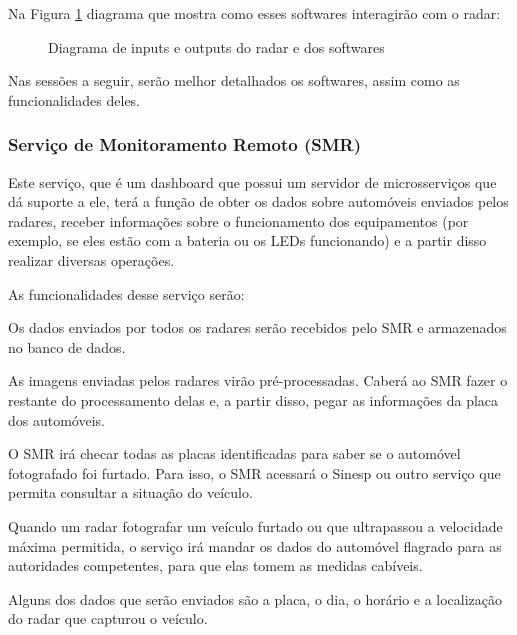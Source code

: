 Na Figura \ref{fig:diagrama-in-out-software} diagrama que mostra como esses softwares interagirão com o radar:

\begin{figure}[!htb]
    \caption{\label{fig:diagrama-in-out-software} Diagrama de inputs e outputs do radar e dos softwares}
\end{figure}

Nas sessões a seguir, serão melhor detalhados os softwares, assim como as funcionalidades deles.

\subsubsection{Serviço de Monitoramento Remoto (SMR)}
Este serviço, que é um dashboard que possui um servidor de microsserviços que dá suporte a ele, terá a função de obter os dados sobre automóveis enviados pelos radares, receber informações sobre o funcionamento dos equipamentos (por exemplo, se eles estão com a bateria ou os LEDs funcionando) e a partir disso realizar diversas operações.

As funcionalidades desse serviço serão:


Os dados enviados por todos os radares serão recebidos pelo SMR e armazenados no banco de dados.


As imagens enviadas pelos radares virão pré-processadas. Caberá ao SMR fazer o restante do processamento delas e, a partir disso, pegar as informações da placa dos automóveis.


O SMR irá checar todas as placas identificadas para saber se o automóvel fotografado foi furtado. Para isso, o SMR acessará o Sinesp ou outro serviço que permita consultar a situação do veículo.


Quando um radar fotografar um veículo furtado ou que ultrapassou a velocidade máxima permitida, o serviço irá mandar os dados do automóvel flagrado para as autoridades competentes, para que elas tomem as medidas cabíveis.

Alguns dos dados que serão enviados são a placa, o dia, o horário e a localização do radar que capturou o veículo.

